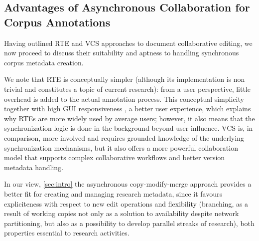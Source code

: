 \documentclass{sig-alternate}
\begin{document}



\subsection{Advantages of Asynchronous Collaboration for Corpus Annotations}
\label{subsec:hybrid}

Having outlined RTE and VCS approaches to document collaborative editing, we now proceed to discuss
their suitability and aptness to handling synchronous corpus metadata creation.

We note that RTE is conceptually simpler (although its implementation is non trivial and 
constitutes a topic of current research): from a user perspective, little overhead is added to
the actual annotation process.
This conceptual simplicity \textemdash together with high GUI responsiveness \textemdash,
a better user experience, which explains why RTEs are more widely used by average users;
however, it also means that the synchronization logic is done in the background beyond user
influence.
VCS is, in comparison, more involved and requires grounded knowledge of the underlying
synchronization mechanisms, but it also offers a more powerful collaboration model that
supports complex collaborative workflows and better version metadata handling.

In our view, \ref{sec:intro} the asynchronous copy-modify-merge approach provides a better fit
for creating and managing research metadata, since it favours expliciteness with respect to new
edit operations and flexibility (branching, as a result of working copies
not only as a solution to availability despite network
partitioning, but also as a possibility to develop parallel streaks of research),
both properties essential to research activities.
\end{document}
